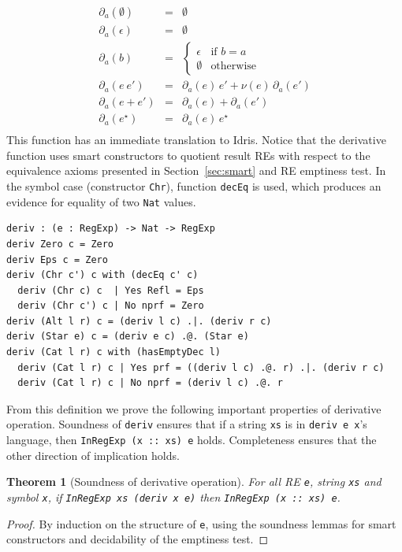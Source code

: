 \documentclass{llncs}
\newcommand{\idris}[1]{\texttt{#1}}%
\newtheorem{Theorem}{Theorem}
\begin{document}
\[
\begin{array}{lclr}
  \partial_a(\emptyset) & = & \emptyset\\
  \partial_a(\epsilon) & = & \emptyset \\
  \partial_a(b) & = & \left\{
                      \begin{array}{lr}
                        \epsilon & \text{if } b = a\\
                        \emptyset & \text{otherwise}
                      \end{array}
                                \right. \\
  \partial_a(e\:e') & = & \partial_a(e)\,e' + \nu(e)\,\partial_a(e')\\
  \partial_a(e + e') & = & \partial_a(e) + \partial_a(e') \\
  \partial_a(e^\star) & = & \partial_a(e)\,e^\star\\
\end{array}
\]
This function has an immediate translation to Idris. Notice that the
derivative function uses smart constructors to quotient result REs
with respect to the equivalence axioms presented in
Section~\ref{sec:smart} and RE emptiness test. In the symbol case
(constructor \idris{Chr}), function \idris{decEq} is used, which
produces an evidence for equality of two \idris{Nat} values.
\begin{verbatim}
deriv : (e : RegExp) -> Nat -> RegExp
deriv Zero c = Zero
deriv Eps c = Zero
deriv (Chr c') c with (decEq c' c)
  deriv (Chr c) c  | Yes Refl = Eps
  deriv (Chr c') c | No nprf = Zero
deriv (Alt l r) c = (deriv l c) .|. (deriv r c)
deriv (Star e) c = (deriv e c) .@. (Star e)
deriv (Cat l r) c with (hasEmptyDec l)
  deriv (Cat l r) c | Yes prf = ((deriv l c) .@. r) .|. (deriv r c)
  deriv (Cat l r) c | No nprf = (deriv l c) .@. r
\end{verbatim}

From this definition we prove the following important properties of
derivative operation. Soundness of \idris{deriv} ensures that if a
string \idris{xs} is in \idris{deriv e x}'s language, then
\idris{InRegExp (x :: xs) e} holds. Completeness ensures that the
other direction of implication holds.
\begin{Theorem}[Soundness of derivative operation]\label{derivsound}
For all RE \idris{e}, string \idris{xs} and symbol \idris{x}, if
\idris{InRegExp xs (deriv x e)} then \idris{InRegExp (x :: xs) e}.
\end{Theorem}
\begin{proof}
  By induction on the structure of \idris{e}, using the soundness
  lemmas for smart constructors and decidability of the emptiness
  test.
\end{proof}
\end{document}

